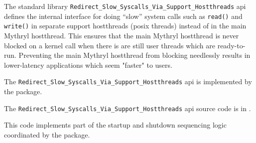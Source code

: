 
The standard library {\tt Redirect\_Slow\_Syscalls\_Via\_Support\_Hostthreads} api defines the internal interface 
for doing ``slow'' system calls such as {\tt read()} and {\tt write()} in separate support hostthreads (posix threads) 
instead of in the main Mythryl hostthread.  This ensures that the main Mythryl hostthread is never blocked on a kernel 
call when there is are still user threads which are ready-to-run.  Preventing the main Mythryl hostthread from blocking 
needlessly results in lower-latency applications which seem "faster" to users. 

The {\tt Redirect\_Slow\_Syscalls\_Via\_Support\_Hostthreads} api is implemented by the 
 package. 

The {\tt Redirect\_Slow\_Syscalls\_Via\_Support\_Hostthreads} api source code is in 
. 

This code implements part of the startup and shutdown sequencing logic coordinated by the 
 package.
